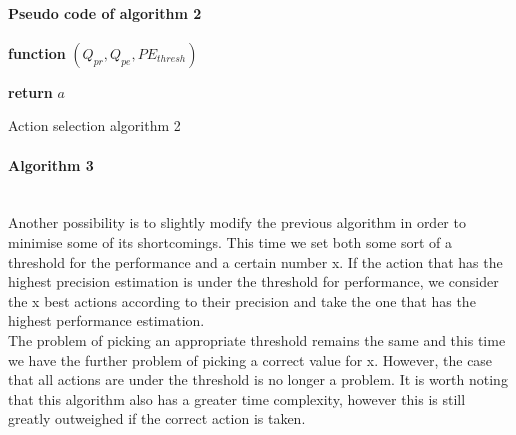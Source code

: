 \paragraph{Pseudo code of algorithm 2}
\begin{center}
	\begin{algorithm}[H]

    \textbf{function}  $(Q_{pr},Q_{pe},PE_{thresh})$\;
    
    
    \Indp{}\Indm
    \Indp{} \Indm
    \Indp
    
   
  
   \textbf{return} $a$
   
    
\caption{Action selection algorithm 2}
\end{algorithm}
\end{center}
\paragraph{Algorithm 3}\mbox{}\\
Another possibility is to slightly modify the previous algorithm in order to minimise some of its shortcomings. This time we set both some sort of a threshold for the performance and a certain number x. If the action that has the highest precision estimation is under the threshold for performance, we consider the x best actions according to their precision and take the one that has the highest performance estimation.\\
The problem of picking an appropriate threshold remains the same and this time we have the further problem of picking a correct value for x. However, the case that all actions are under the threshold is no longer a problem. It is worth noting that this algorithm also has a greater time complexity, however this is still greatly outweighed if the correct action is taken.

